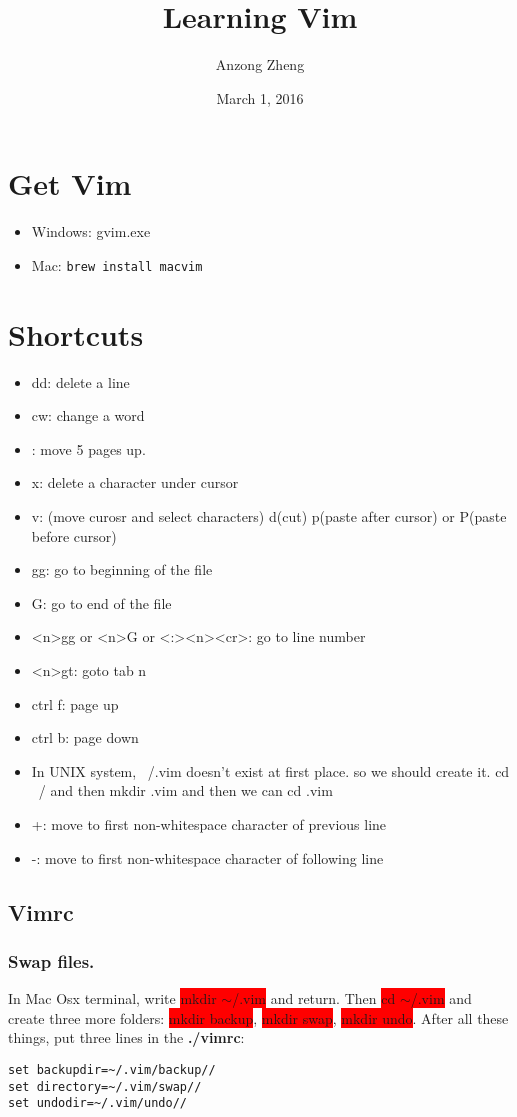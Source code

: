 \documentclass[10pt,a4paper]{book}
\begin{document}
\author{Anzong Zheng}
\title{Learning Vim}
\date{March 1, 2016}
\maketitle
\newpage


\tableofcontents
\newpage

\chapter{Get Vim}
\begin{itemize}
	\item Windows: gvim.exe
	\item Mac: \lstinline{brew install macvim}
\end{itemize}
\chapter{Shortcuts}
\begin{itemize}
\item dd: delete a line
\item cw: change a word
\item <5><page up>: move 5 pages up.
\item x: delete a character under cursor
\item v: (move curosr and select characters)	d(cut)	p(paste after cursor) or P(paste before cursor)
\item gg: go to beginning of the file
\item G: go to end of the file
\item <n>gg or <n>G or <:><n><cr>:	go to line number
\item <n>gt: goto tab n
\item ctrl f: page up
\item ctrl b: page down
\item In UNIX system, ~/.vim doesn't exist at first place. so we should create it. cd ~/ and then mkdir .vim and then we can cd .vim
\item +: move to first non-whitespace character of previous line
\item -: move to first non-whitespace character of following line
\end{itemize}

\section{Vimrc}
\subsection{Swap files.}
In Mac Osx terminal, write \colorbox{red}{ mkdir $ \sim $/.vim} and return. Then \colorbox{red}{cd $ \sim $/.vim} and create three more folders: \colorbox{red}{mkdir backup}, \colorbox{red}{mkdir swap}, \colorbox{red}{mkdir undo}. After all these things, put three lines in the \textbf{./vimrc}:
\begin{lstlisting}
set backupdir=~/.vim/backup//
set directory=~/.vim/swap//
set undodir=~/.vim/undo//
\end{lstlisting}
\end{document}
